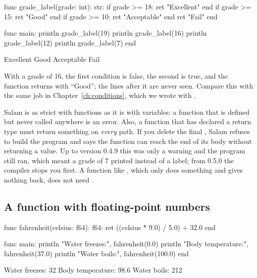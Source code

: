 \begin{salamcode}
func grade_label(grade: int): str:
    if grade >= 18: ret "Excellent" end
    if grade >= 15: ret "Good" end
    if grade >= 10: ret "Acceptable" end
    ret "Fail"
end

func main:
    println grade_label(19)
    println grade_label(16)
    println grade_label(12)
    println grade_label(7)
end
\end{salamcode}

\begin{salamout}
Excellent
Good
Acceptable
Fail
\end{salamout}

With a grade of 16, the first condition is false, the second is true, and
the function returns with ``Good''; the lines after it are never seen.
Compare this with the same job in Chapter~\ref{ch:conditions}, which we
wrote with .

\begin{warn}
Salam is as strict with functions as it is with variables: a function that
is defined but never called anywhere is an error. Also, a function that has
declared a return type must return something on \emph{every} path. If you
delete the final , Salam refuses to build the program and
says the function can reach the end of its body without returning a value.
Up to version 0.4.9 this was only a warning and the program still ran, which
meant a grade of 7 printed  instead of a label; from 0.5.0 the
compiler stops you first. A function like , which only does
something and gives nothing back, does not need .
\end{warn}

\subsection{A function with floating-point numbers}

\begin{salamcode}
func fahrenheit(celsius: f64): f64:
    ret ((celsius * 9.0) / 5.0) + 32.0
end

func main:
    println "Water freezes:", fahrenheit(0.0)
    println "Body temperature:", fahrenheit(37.0)
    println "Water boils:", fahrenheit(100.0)
end
\end{salamcode}

\begin{salamout}
Water freezes: 32
Body temperature: 98.6
Water boils: 212
\end{salamout}

